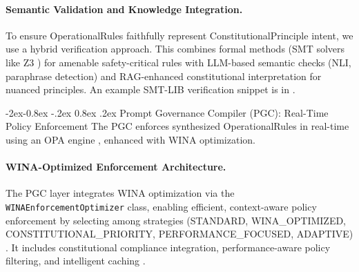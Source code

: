 \documentclass[manuscript,screen,9pt]{acmart}
\makeatletter
\renewcommand\subsubsection{\@startsection{subsubsection}{3}{\z@}%
  {-2ex\@plus -0.8ex \@minus -.2ex}%
  {0.8ex \@plus .2ex}%
  {\normalfont\normalsize\bfseries}}
\makeatother
\begin{document}
\paragraph{Semantic Validation and Knowledge Integration.}
\label{subsubsec:semantic_validation}
To ensure OperationalRules faithfully represent ConstitutionalPrinciple intent, we use a hybrid verification approach. This combines formal methods (SMT solvers like Z3 \cite{Barrett2018SMTSolving, DeMouraZ3}) for amenable safety-critical rules with LLM-based semantic checks (NLI, paraphrase detection) and RAG-enhanced constitutional interpretation for nuanced principles. An example SMT-LIB verification snippet is in .

\subsubsection{Prompt Governance Compiler (PGC): Real-Time Policy Enforcement}
\label{subsubsec:pgc_layer}
The PGC enforces synthesized OperationalRules in real-time using an OPA engine \cite{Sandall2021OPAReference}, enhanced with WINA optimization.

\paragraph{WINA-Optimized Enforcement Architecture.} The PGC layer integrates WINA optimization via the \texttt{WINA\allowbreak Enforcement\allowbreak Optimizer} class, enabling efficient, context-aware policy enforcement by selecting among strategies (STANDARD, WINA\_OPTIMIZED, CONSTITUTIONAL\_PRIORITY, PERFORMANCE\_FOCUSED, ADAPTIVE) \cite{PolicyEnforcementOptimization2024}. It includes constitutional compliance integration, performance-aware policy filtering, and intelligent caching \cite{ConstitutionalCompliance2024, IntelligentCaching2024}.
\end{document}
